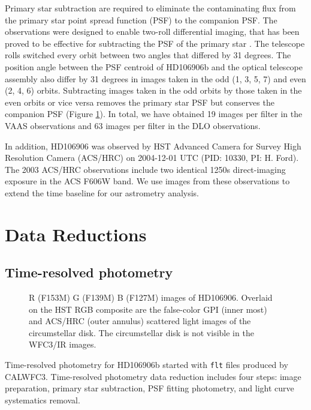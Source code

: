 \documentclass[twocolumn]{aastex62}
\begin{document}
Primary star subtraction are required to eliminate the contaminating flux from the primary star point spread function (PSF) to the companion PSF. The observations were designed to enable two-roll differential imaging, that has been proved to be effective for subtracting the PSF of the primary star \citep{Zhou2016,Zhou201}. The telescope rolls switched every orbit between two angles that differed by 31 degrees. The position angle between the PSF centroid of HD106906b and the optical telescope assembly also differ by 31 degrees in images taken in the odd (1, 3, 5, 7) and even (2, 4, 6) orbits. Subtracting images taken in the odd orbits by those taken in the even orbits or vice versa removes the primary star PSF but conserves the companion PSF (Figure \ref{fig:2rdi}). In total, we have obtained 19 images per filter in the VAAS observations and 63 images per filter in the DLO observations. 

In addition, HD106906 was observed by HST Advanced Camera for Survey High Resolution Camera (ACS/HRC) on 2004-12-01 UTC (PID: 10330, PI: H. Ford). The 2003 ACS/HRC observations include two identical 1250s direct-imaging exposure in the ACS F606W band. We use images from these observations to extend the time baseline for our astrometry analysis.

\section{Data Reductions}

\subsection{Time-resolved photometry}
\begin{figure}
  \centering
  \caption{R (F153M) G (F139M) B (F127M) images of HD106906. Overlaid on the HST RGB composite are the false-color GPI (inner most) and ACS/HRC (outer annulus) scattered light images \citep{Kalas2015} of the circumstellar disk. The circumstellar disk is not visible in the WFC3/IR images.}
  \label{fig:2rdi}
\end{figure}

Time-resolved photometry for HD106906b started with \texttt{flt} files produced by CALWFC3. Time-resolved photometry data reduction includes four steps: image preparation, primary star subtraction, PSF fitting photometry, and light curve systematics removal.
\end{document}
